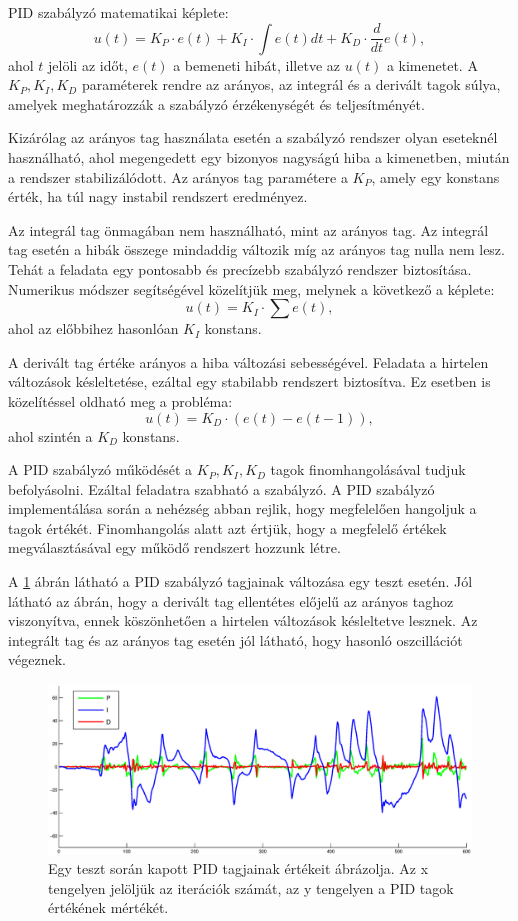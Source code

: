PID szabályzó matematikai képlete: $$u(t)=K_{P}\cdot e(t)+K_{I}\cdot\int e(t)dt+K_{D}\cdot\frac{d}{dt}e(t),$$ ahol $t$ jelöli az időt, $e(t)$ a bemeneti hibát, illetve az $u(t)$ a kimenetet. A $K_{P}, K_{I}, K_{D}$ paraméterek rendre az arányos, az integrál és a derivált tagok súlya, amelyek meghatározzák a szabályzó érzékenységét és teljesítményét.

Kizárólag az arányos tag használata esetén a szabályzó rendszer olyan eseteknél használható, ahol megengedett egy bizonyos nagyságú hiba a kimenetben, miután a rendszer stabilizálódott. Az arányos tag paramétere a $K_{P}$, amely egy konstans érték, ha túl nagy instabil rendszert eredményez.

Az integrál tag önmagában nem használható, mint az arányos tag. Az integrál tag esetén a hibák összege mindaddig változik míg az arányos tag nulla nem lesz. Tehát a feladata egy pontosabb és precízebb szabályzó rendszer biztosítása. Numerikus módszer segítségével közelítjük meg, melynek a következő a képlete:$$u(t)=K_{I}\cdot\sum e(t),$$ ahol az előbbihez hasonlóan $K_{I}$ konstans.

A derivált tag értéke arányos a hiba változási sebességével. Feladata a hirtelen változások késleltetése, ezáltal egy stabilabb rendszert biztosítva. Ez esetben is közelítéssel oldható meg a probléma:$$u(t)=K_{D}\cdot (e(t) - e(t-1)),$$ ahol szintén a $K_{D}$ konstans.

A PID szabályzó működését a $K_{P}, K_{I}, K_{D}$ tagok finomhangolásával tudjuk befolyásolni. Ezáltal feladatra szabható a szabályzó.  A PID szabályzó implementálása során a nehézség abban rejlik, hogy megfelelően hangoljuk a tagok értékét. Finomhangolás alatt azt értjük, hogy a megfelelő értékek megválasztásával egy működő rendszert hozzunk létre.

A \ref{pidFig} ábrán látható a PID szabályzó tagjainak változása egy teszt esetén. Jól látható az ábrán, hogy a derivált tag ellentétes előjelű az arányos taghoz viszonyítva, ennek köszönhetően a hirtelen változások késleltetve lesznek. Az integrált tag és az arányos tag esetén jól látható, hogy hasonló oszcillációt végeznek.

\begin{figure}[h]
	\centering
	\includegraphics[width=1\linewidth]{images/pid.eps}
	\captionsetup{justification=centering,margin=1.5cm}
	\caption[Egy teszt során kapott PID tagjainak értékeit ábrázolja]
	{Egy teszt során kapott PID tagjainak értékeit ábrázolja. Az x tengelyen jelöljük az iterációk számát, az y tengelyen a PID tagok értékének mértékét.}
	\label{pidFig}
\end{figure}
